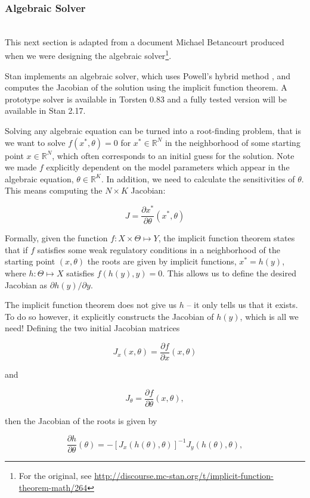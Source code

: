 \documentclass[11pt]{amsart}
\begin{document}
\subsubsection{Algebraic Solver} \ \\

This next section is adapted from a document Michael Betancourt produced
when we were designing the algebraic solver\footnote{For the original, see
\url{http://discourse.mc-stan.org/t/implicit-function-theorem-math/264}}. 

Stan implements an algebraic solver, which uses Powell's hybrid method \cite{Powell:1970},
and computes the Jacobian of the solution using the implicit function theorem. A prototype
solver is available in Torsten 0.83 and a fully tested version will be available in Stan 2.17.

Solving any algebraic equation can be turned into a root-finding problem, that is we want
to solve $f(x^*, \theta) = 0$ for $x^* \in \mathbb{R}^N$ in the neighborhood of some starting 
point $x \in \mathbb{R}^N$, which often corresponds to an initial guess for the solution. Note we
made $f$ explicitly dependent on the model parameters which appear in the algebraic
equation, $\theta \in \mathbb{R}^K$. In addition, we need to calculate the sensitivities 
of $\theta$. This means computing the $N \times K$ Jacobian:

$$
J = \frac{\partial x^*}{\partial \theta}(x^*, \theta)
$$

Formally, given the function $f: X \times \Theta \mapsto Y$, the implicit function theorem
states that if $f$ satisfies some weak regulatory conditions in a neighborhood of the
starting point $(x, \theta)$ the roots are given by implicit functions, $x^* = h(y)$, where
$h:\Theta \mapsto X$ satisfies $f(h(y), y) = 0$. This allows us to define the desired
Jacobian as $\partial h(y) / \partial y$.

The implicit function theorem does not give us $h$ -- it only tells us that it exists. To
do so however, it explicitly constructs the Jacobian of $h(y)$, which is all we need!
Defining the two initial Jacobian matrices

$$
J_x(x, \theta) = \frac{\partial f}{\partial x} (x, \theta)
$$

and

$$
J_\theta = \frac{\partial f}{\partial \theta} (x, \theta),
$$

then the Jacobian of the roots is given by

$$
\frac{\partial h}{\partial \theta}(\theta) = - [J_x(h(\theta), \theta)]^{-1} J_y(h(\theta), \theta),
$$
\end{document}
